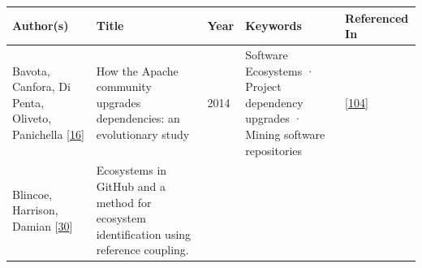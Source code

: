 \documentclass[]{book}
\begin{document}
\begin{longtable}[]{@{}lllll@{}}
\toprule
\begin{minipage}[b]{0.12\columnwidth}\raggedright\strut
Author(s)\strut
\end{minipage} & \begin{minipage}[b]{0.31\columnwidth}\raggedright\strut
Title\strut
\end{minipage} & \begin{minipage}[b]{0.02\columnwidth}\raggedright\strut
Year\strut
\end{minipage} & \begin{minipage}[b]{0.24\columnwidth}\raggedright\strut
Keywords\strut
\end{minipage} & \begin{minipage}[b]{0.16\columnwidth}\raggedright\strut
Referenced In\strut
\end{minipage}\tabularnewline
\midrule
\endhead
\begin{minipage}[t]{0.12\columnwidth}\raggedright\strut
Bavota, Canfora, Di Penta, Oliveto, Panichella
{[}\protect\hyperlink{ref-Bavota2014}{16}{]}\strut
\end{minipage} & \begin{minipage}[t]{0.31\columnwidth}\raggedright\strut
How the Apache community upgrades dependencies: an evolutionary
study\strut
\end{minipage} & \begin{minipage}[t]{0.02\columnwidth}\raggedright\strut
2014\strut
\end{minipage} & \begin{minipage}[t]{0.24\columnwidth}\raggedright\strut
Software Ecosystems · Project dependency upgrades · Mining software
repositories\strut
\end{minipage} & \begin{minipage}[t]{0.16\columnwidth}\raggedright\strut
{[}\protect\hyperlink{ref-Kula2017}{104}{]}\strut
\end{minipage}\tabularnewline
\begin{minipage}[t]{0.12\columnwidth}\raggedright\strut
Blincoe, Harrison, Damian
{[}\protect\hyperlink{ref-Blincoe2015}{30}{]}\strut
\end{minipage} & \begin{minipage}[t]{0.31\columnwidth}\raggedright\strut
Ecosystems in GitHub and a method for ecosystem identification using
reference coupling.\strut
\end{minipage} & \begin{minipage}[t]{0.02\columnwidth}\raggedright\strut

\end{minipage}
\end{longtable}
\end{document}
